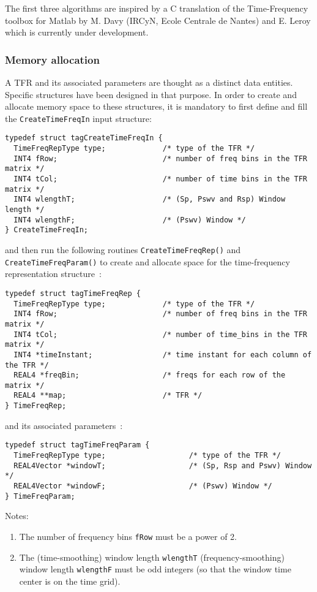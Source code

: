 \documentclass{article}
\begin{document}
The first three algorithms are inspired by a C translation of the
Time-Frequency toolbox for Matlab by M. Davy (IRCyN, Ecole Centrale de
Nantes) and E. Leroy which is currently under development.

\subsubsection{Memory allocation}
A TFR and its associated parameters are thought as a distinct data
entities. Specific structures have been designed in that purpose. In
order to create and allocate memory space to these structures, it is
mandatory to first define and fill the \texttt{CreateTimeFreqIn} input
structure:
\begin{verbatim}
typedef struct tagCreateTimeFreqIn {
  TimeFreqRepType type;             /* type of the TFR */
  INT4 fRow;                        /* number of freq bins in the TFR matrix */
  INT4 tCol;                        /* number of time bins in the TFR matrix */
  INT4 wlengthT;                    /* (Sp, Pswv and Rsp) Window length */
  INT4 wlengthF;                    /* (Pswv) Window */
} CreateTimeFreqIn;
\end{verbatim}
and then run the following routines \texttt{CreateTimeFreqRep()} and
\texttt{CreateTimeFreqParam()} to create and allocate space for the
time-frequency representation structure~:
\begin{verbatim}
typedef struct tagTimeFreqRep {
  TimeFreqRepType type;             /* type of the TFR */
  INT4 fRow;                        /* number of freq bins in the TFR matrix */
  INT4 tCol;                        /* number of time_bins in the TFR matrix */
  INT4 *timeInstant;                /* time instant for each column of the TFR */
  REAL4 *freqBin;                   /* freqs for each row of the matrix */
  REAL4 **map;                      /* TFR */
} TimeFreqRep;
\end{verbatim}
and its associated parameters~:
\begin{verbatim}
typedef struct tagTimeFreqParam {
  TimeFreqRepType type;                   /* type of the TFR */
  REAL4Vector *windowT;                   /* (Sp, Rsp and Pswv) Window */
  REAL4Vector *windowF;                   /* (Pswv) Window */
} TimeFreqParam;
\end{verbatim}

\vspace{3mm}
Notes:
\begin{enumerate}
\item The number of frequency bins \texttt{fRow} must be a power of 2.
\item The (time-smoothing) window length \texttt{wlengthT}
(frequency-smoothing) window length \texttt{wlengthF} must be odd
integers (so that the window time center is on the time grid).
\end{enumerate}
\end{document}
